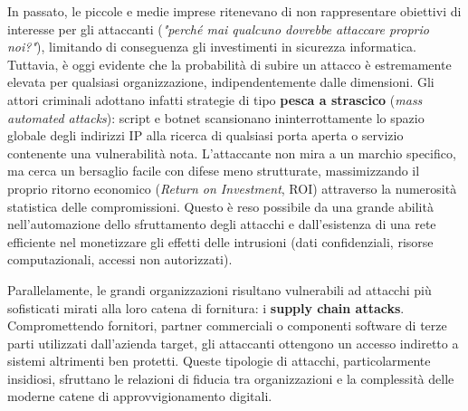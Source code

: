 \documentclass[../../main.tex]{subfiles}
\begin{document}
In passato, le piccole e medie imprese ritenevano di non rappresentare obiettivi di interesse per gli attaccanti (\textit{"perché mai qualcuno dovrebbe attaccare proprio noi?"}), limitando di conseguenza gli investimenti in sicurezza informatica. Tuttavia, è oggi evidente che la probabilità di subire un attacco è estremamente elevata per qualsiasi organizzazione, indipendentemente dalle dimensioni. Gli attori criminali adottano infatti strategie di tipo \textbf{pesca a strascico} (\textit{mass automated attacks}): script e botnet scansionano ininterrottamente lo spazio globale degli indirizzi IP alla ricerca di qualsiasi porta aperta o servizio contenente una vulnerabilità nota. L'attaccante non mira a un marchio specifico, ma cerca un bersaglio facile con difese meno strutturate, massimizzando il proprio ritorno economico (\textit{Return on Investment}, ROI) attraverso la numerosità statistica delle compromissioni. Questo è reso possibile da una grande abilità nell'automazione dello sfruttamento degli attacchi e dall'esistenza di una rete efficiente nel monetizzare gli effetti delle intrusioni (dati confidenziali, risorse computazionali, accessi non autorizzati).

Parallelamente, le grandi organizzazioni risultano vulnerabili ad attacchi più sofisticati mirati alla loro catena di fornitura: i \textbf{supply chain attacks}. Compromettendo fornitori, partner commerciali o componenti software di terze parti utilizzati dall'azienda target, gli attaccanti ottengono un accesso indiretto a sistemi altrimenti ben protetti. Queste tipologie di attacchi, particolarmente insidiosi, sfruttano le relazioni di fiducia tra organizzazioni e la complessità delle moderne catene di approvvigionamento digitali.
\end{document}
